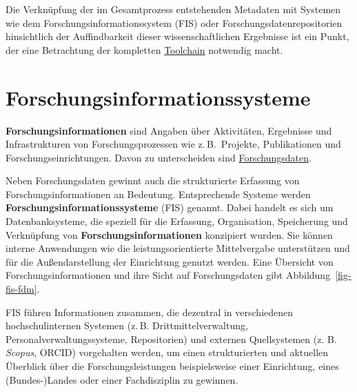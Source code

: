 \documentclass[
  11pt,
  letterpaper,
  DIV=11,
  twoside]{scrreprt}
\begin{document}
Die Verknüpfung der im Gesamtprozess entstehenden Metadaten mit Systemen
wie dem Forschungsinformationssystem ({FIS}) oder
Forschungsdatenrepositorien hinsichtlich der Auffindbarkeit dieser
wissenschaftlichen Ergebnisse ist ein Punkt, der eine Betrachtung der
kompletten \hyperref[toolchains]{Toolchain} notwendig macht.

\vfill
\pagebreak

\section{Forschungsinformationssysteme}\label{forschungsinformationssysteme}

\begin{tcolorbox}[enhanced jigsaw, leftrule=.75mm, toprule=.15mm, left=2mm, opacityback=0, arc=.35mm, colback=white, breakable, colframe=quarto-callout-important-color-frame, rightrule=.15mm, bottomrule=.15mm]
\begin{minipage}[t]{5.5mm}
\textcolor{quarto-callout-important-color}{\faExclamation}
\end{minipage}%
\begin{minipage}[t]{\textwidth - 5.5mm}

\textbf{Forschungsinformationen} sind Angaben über Aktivitäten,
Ergebnisse und Infrastrukturen von Forschungsprozessen wie
z.\,B.~Projekte, Publikationen und Forschungseinrichtungen. Davon zu
unterscheiden sind
\hyperref[forschungsdatenmanagement]{Forschungsdaten}.

\end{minipage}%
\end{tcolorbox}

Neben Forschungsdaten gewinnt auch die strukturierte Erfassung von
Forschungsinformationen an Bedeutung. Entsprechende Systeme werden
\textbf{Forschungsinformationssysteme} ({FIS}) genannt. Dabei handelt es
sich um Datenbanksysteme, die speziell für die Erfassung, Organisation,
Speicherung und Verknüpfung von \textbf{Forschungsinformationen}
konzipiert wurden. Sie können interne Anwendungen wie die
leistungsorientierte Mittelvergabe unterstützen und für die
Außendarstellung der Einrichtung genutzt werden. Eine Übersicht von
Forschungsinformationen und ihre Sicht auf Forschungsdaten gibt
Abbildung~\ref{fig-fis-fdm}.

{FIS} führen Informationen zusammen, die dezentral in verschiedenen
hochschulinternen Systemen (z.\,B. Drittmittelverwaltung,
Personalverwaltungssysteme, Repositorien) und externen Quellsystemen (z.
B. \emph{Scopus}, {ORCID}) vorgehalten werden, um einen strukturierten
und aktuellen Überblick über die Forschungsleistungen beispielsweise
einer Einrichtung, eines (Bundes-)Landes oder einer Fachdisziplin zu
gewinnen.
\end{document}
